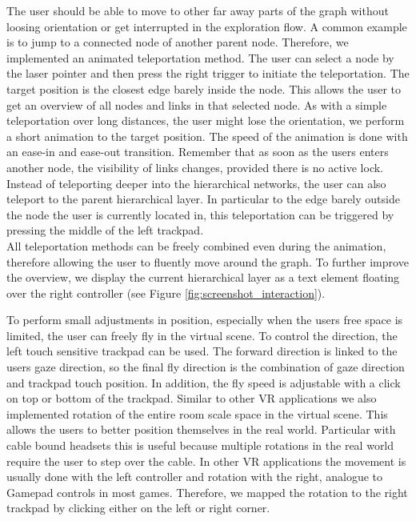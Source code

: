 The user should be able to move to other far away parts of the graph without loosing orientation or get interrupted in the exploration flow. A common example is to jump to a connected node of another parent node. 
Therefore, we implemented an animated teleportation method. The user can select a node by the laser pointer and then press the right trigger to initiate the teleportation. The target position is the closest edge barely inside the node. This allows the user to get an overview of all nodes and links in that selected node.   
As with a simple teleportation over long distances, the user might lose the orientation, we perform a short animation to the target position. The speed of the animation is done with an ease-in and ease-out transition.
Remember that as soon as the users enters another node, the visibility of links changes, provided there is no active lock.\\
Instead of teleporting deeper into the hierarchical networks, the user can also teleport to the parent hierarchical layer. In particular to the edge barely outside the node the user is currently located in, this teleportation can be triggered by pressing the middle of the left trackpad.\\
All teleportation methods can be freely combined even during the animation, therefore allowing the user to fluently move around the graph. 
To further improve the overview, we display the current hierarchical layer as a text element floating over the right controller (see Figure \ref{fig:screenshot_interaction}). 

To perform small adjustments in position, especially when the users free space is limited, the user can freely fly in the virtual scene. To control the direction, the left touch sensitive trackpad can be used. 
The forward direction is linked to the users gaze direction, so the final fly direction is the combination of gaze direction and trackpad touch position. 
In addition, the fly speed is adjustable with a click on top or bottom of the trackpad.    
Similar to other VR applications we also implemented rotation of the entire room scale space in the virtual scene. This allows the users to better position themselves in the real world. 
Particular with cable bound headsets this is useful because multiple rotations in the real world require the user to step over the cable. In other VR applications the movement is usually done with the left controller and rotation with the right, analogue to Gamepad controls in most games. Therefore, we mapped the rotation to the right trackpad by clicking either on the left or right corner.

